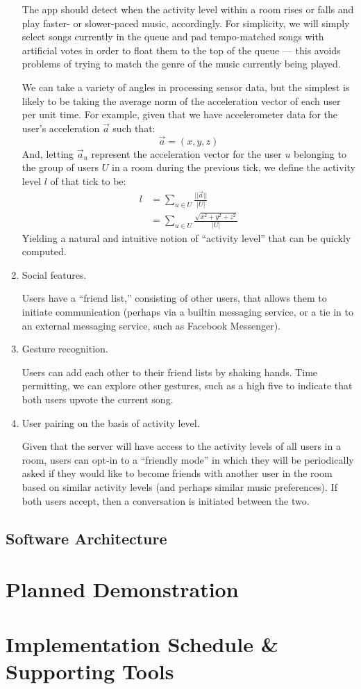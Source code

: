 \documentclass[12pt]{article}
\begin{document}
\begin{enumerate}
The app should detect when the activity level within a room rises or
falls and play faster- or slower-paced music, accordingly. For
simplicity, we will simply select songs currently in the queue and pad
tempo-matched songs with artificial votes in order to float them to
the top of the queue --- this avoids problems of trying to match the
genre of the music currently being played.

We can take a variety of angles in processing sensor data, but the
simplest is likely to be taking the average norm of the acceleration
vector of each user per unit time. For example, given that we have
accelerometer data for the user's acceleration $\vec{a}$ such that:
\[
\vec{a} = (x, y, z)
\]
And, letting $\vec{a}_u$ represent the acceleration vector for the user
$u$ belonging to the group of users $U$ in a room during the previous
tick, we define the activity level $l$ of that tick to be:
\begin{align*}
  l &= \sum_{u \in U} \frac{||\vec{a}||}{|U|}\\
  &= \sum_{u \in U} \frac{\sqrt{x^2 + y^2 + z^2}}{|U|}
\end{align*}
Yielding a natural and intuitive notion of ``activity level'' that can
be quickly computed.


\item Social features.

Users have a ``friend list,'' consisting of other users, that allows
them to initiate communication (perhaps via a builtin messaging
service, or a tie in to an external messaging service, such as
Facebook Messenger).

\item Gesture recognition.

Users can add each other to their friend lists by shaking hands. Time
permitting, we can explore other gestures, such as a high five to
indicate that both users upvote the current song.

\item User pairing on the basis of activity level.

Given that the server will have access to the activity levels of all
users in a room, users can opt-in to a ``friendly mode'' in which they
will be periodically asked if they would like to become friends with
another user in the room based on similar activity levels (and perhaps
similar music preferences). If both users accept, then a conversation
is initiated between the two.

\end{enumerate}

\subsection{Software Architecture}

\pagebreak

\section{Planned Demonstration}

\pagebreak

\section{Implementation Schedule \& Supporting Tools}
\end{document}
